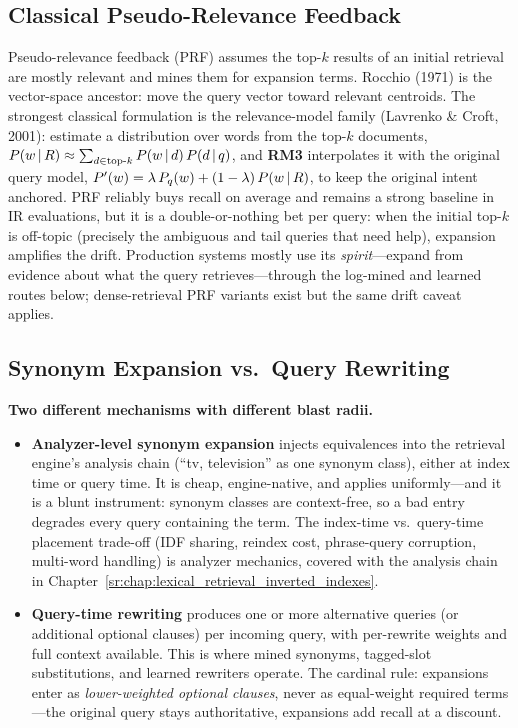 \subsection{Classical Pseudo-Relevance Feedback}
\label{sr:sec:prf_rm3}

Pseudo-relevance feedback (PRF) assumes the top-$k$ results of an initial retrieval are mostly relevant and mines them for expansion terms. Rocchio (1971) is the vector-space ancestor: move the query vector toward relevant centroids. The strongest classical formulation is the relevance-model family (Lavrenko \& Croft, 2001): estimate a distribution over words from the top-$k$ documents, $P(w \,|\, R) \approx \sum_{d \in \text{top-}k} P(w \,|\, d)\, P(d \,|\, q)$, and \textbf{RM3} interpolates it with the original query model, $P'(w) = \lambda\, P_q(w) + (1-\lambda)\, P(w \,|\, R)$, to keep the original intent anchored. PRF reliably buys recall on average and remains a strong baseline in IR evaluations, but it is a double-or-nothing bet per query: when the initial top-$k$ is off-topic (precisely the ambiguous and tail queries that need help), expansion amplifies the drift. Production systems mostly use its \textit{spirit}---expand from evidence about what the query retrieves---through the log-mined and learned routes below; dense-retrieval PRF variants exist but the same drift caveat applies.

\subsection{Synonym Expansion vs.\ Query Rewriting}
\label{sr:sec:synonyms_vs_rewriting}

\textbf{Two different mechanisms with different blast radii.}
\begin{itemize}
    \item \textbf{Analyzer-level synonym expansion} injects equivalences into the retrieval engine's analysis chain (``tv, television'' as one synonym class), either at index time or query time. It is cheap, engine-native, and applies uniformly---and it is a blunt instrument: synonym classes are context-free, so a bad entry degrades every query containing the term. The index-time vs.\ query-time placement trade-off (IDF sharing, reindex cost, phrase-query corruption, multi-word handling) is analyzer mechanics, covered with the analysis chain in Chapter~\ref{sr:chap:lexical_retrieval_inverted_indexes}.
    \item \textbf{Query-time rewriting} produces one or more alternative queries (or additional optional clauses) per incoming query, with per-rewrite weights and full context available. This is where mined synonyms, tagged-slot substitutions, and learned rewriters operate. The cardinal rule: expansions enter as \textit{lower-weighted optional clauses}, never as equal-weight required terms---the original query stays authoritative, expansions add recall at a discount.
\end{itemize}

